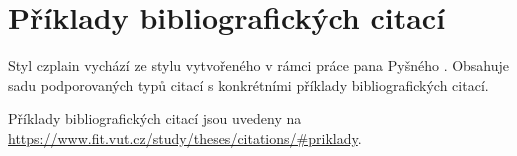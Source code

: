 \chapter{Příklady bibliografických citací}
\label{priloha-priklady-citaci}
Styl czplain vychází ze stylu vytvořeného v rámci práce pana Pyšného \cite{Pysny}. Obsahuje sadu podporovaných typů citací s konkrétními příklady bibliografických citací.

Příklady bibliografických citací jsou uvedeny na \url{https://www.fit.vut.cz/study/theses/citations/#priklady}.

%
%
